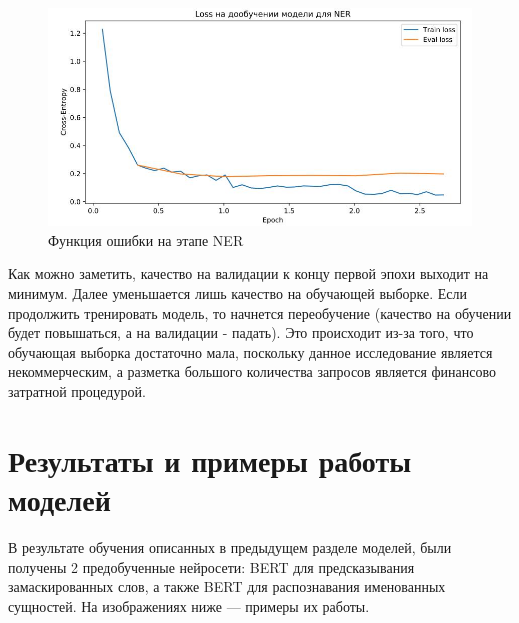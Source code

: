\documentclass[12pt,a4paper]{article}
\begin{document}
\begin{figure}[H]
	\begin{center}
		\includegraphics[scale=0.4]{loss_ner.jpg}
	\end{center}
	\caption{Функция ошибки на этапе NER}
\end{figure}

\noindent Как можно заметить, качество на валидации к концу первой эпохи выходит на минимум. Далее уменьшается лишь качество на обучающей выборке. Если продолжить тренировать модель, то начнется переобучение (качество на обучении будет повышаться, а на валидации - падать). Это происходит из-за того, что обучающая выборка достаточно мала, поскольку данное исследование является некоммерческим, а разметка большого количества запросов является финансово затратной процедурой.

\section{Результаты и примеры работы моделей}

В результате обучения описанных в предыдущем разделе моделей, были получены 2 предобученные нейросети: BERT для предсказывания замаскированных слов, а также BERT для распознавания именованных сущностей. На изображениях ниже --- примеры их работы.
\end{document}
